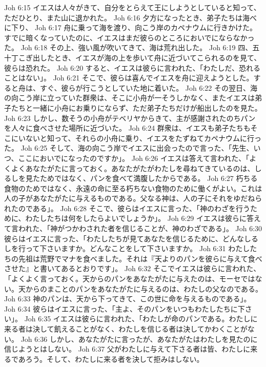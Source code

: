 Joh 6:15  イエスは人々がきて、自分をとらえて王にしようとしていると知って、ただひとり、また山に退かれた。
Joh 6:16  夕方になったとき、弟子たちは海べに下り、
Joh 6:17  舟に乗って海を渡り、向こう岸のカペナウムに行きかけた。すでに暗くなっていたのに、イエスはまだ彼らのところにおいでにならなかった。
Joh 6:18  その上、強い風が吹いてきて、海は荒れ出した。
Joh 6:19  四、五十丁こぎ出したとき、イエスが海の上を歩いて舟に近づいてこられるのを見て、彼らは恐れた。
Joh 6:20  すると、イエスは彼らに言われた、「わたしだ、恐れることはない」。
Joh 6:21  そこで、彼らは喜んでイエスを舟に迎えようとした。すると舟は、すぐ、彼らが行こうとしていた地に着いた。
Joh 6:22  その翌日、海の向こう岸に立っていた群衆は、そこに小舟が一そうしかなく、またイエスは弟子たちと一緒に小舟にお乗りにならず、ただ弟子たちだけが船出したのを見た。
Joh 6:23  しかし、数そうの小舟がテベリヤからきて、主が感謝されたのちパンを人々に食べさせた場所に近づいた。
Joh 6:24  群衆は、イエスも弟子たちもそこにいないと知って、それらの小舟に乗り、イエスをたずねてカペナウムに行った。
Joh 6:25  そして、海の向こう岸でイエスに出会ったので言った、「先生、いつ、ここにおいでになったのですか」。
Joh 6:26  イエスは答えて言われた、「よくよくあなたがたに言っておく。あなたがたがわたしを尋ねてきているのは、しるしを見たためではなく、パンを食べて満腹したからである。
Joh 6:27  朽ちる食物のためではなく、永遠の命に至る朽ちない食物のために働くがよい。これは人の子があなたがたに与えるものである。父なる神は、人の子にそれをゆだねられたのである」。
Joh 6:28  そこで、彼らはイエスに言った、「神のわざを行うために、わたしたちは何をしたらよいでしょうか」。
Joh 6:29  イエスは彼らに答えて言われた、「神がつかわされた者を信じることが、神のわざである」。
Joh 6:30  彼らはイエスに言った、「わたしたちが見てあなたを信じるために、どんなしるしを行って下さいますか。どんなことをして下さいますか。
Joh 6:31  わたしたちの先祖は荒野でマナを食べました。それは『天よりのパンを彼らに与えて食べさせた』と書いてあるとおりです」。
Joh 6:32  そこでイエスは彼らに言われた、「よくよく言っておく。天からのパンをあなたがたに与えたのは、モーセではない。天からのまことのパンをあなたがたに与えるのは、わたしの父なのである。
Joh 6:33  神のパンは、天から下ってきて、この世に命を与えるものである」。
Joh 6:34  彼らはイエスに言った、「主よ、そのパンをいつもわたしたちに下さい」。
Joh 6:35  イエスは彼らに言われた、「わたしが命のパンである。わたしに来る者は決して飢えることがなく、わたしを信じる者は決してかわくことがない。
Joh 6:36  しかし、あなたがたに言ったが、あなたがたはわたしを見たのに信じようとはしない。
Joh 6:37  父がわたしに与えて下さる者は皆、わたしに来るであろう。そして、わたしに来る者を決して拒みはしない。
